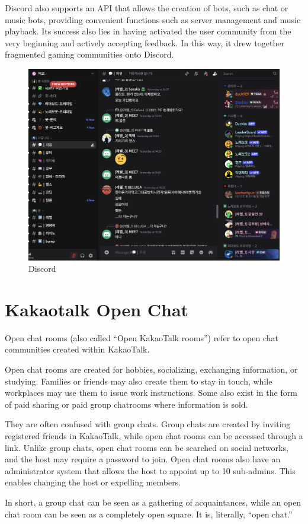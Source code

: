Discord also supports an API that allows the creation of bots, such as chat or music bots, providing convenient functions such as server management and music playback. Its success also lies in having activated the user community from the very beginning and actively accepting feedback. In this way, it drew together fragmented gaming communities onto Discord.  

\begin{figure}[tbph!]
	\centering
	\includegraphics[width=0.7\linewidth]{template/images/chap4/discord.png}
	\caption[Discord]{Discord}
	\label{fig:image}
\end{figure}

\section{Kakaotalk Open Chat}
Open chat rooms (also called “Open KakaoTalk rooms”) refer to open chat communities created within KakaoTalk.  

Open chat rooms are created for hobbies, socializing, exchanging information, or studying. Families or friends may also create them to stay in touch, while workplaces may use them to issue work instructions. Some also exist in the form of paid sharing or paid group chatrooms where information is sold.  

They are often confused with group chats. Group chats are created by inviting registered friends in KakaoTalk, while open chat rooms can be accessed through a link. Unlike group chats, open chat rooms can be searched on social networks, and the host may require a password to join. Open chat rooms also have an administrator system that allows the host to appoint up to 10 sub-admins. This enables changing the host or expelling members.  

In short, a group chat can be seen as a gathering of acquaintances, while an open chat room can be seen as a completely open square. It is, literally, “open chat.”  

